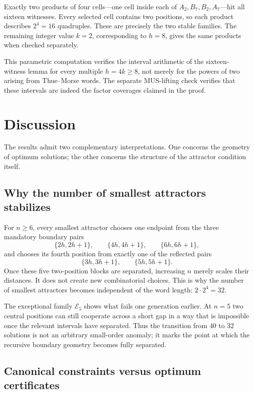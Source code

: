 \documentclass[10pt,a4paper]{article}
\theoremstyle{definition}\newtheorem{definition}[theorem]{Definition}
\theoremstyle{remark}\newtheorem{remark}[theorem]{Remark}
\begin{document}
Exactly two products of four cells---one cell inside each of $A_2,B_7,B_2,A_7$---hit all sixteen witnesses.  Every selected cell contains two positions, so each product describes $2^4=16$ quadruples.  These are precisely the two stable families.  The remaining integer value $k=2$, corresponding to $h=8$, gives the same products when checked separately.

This parametric computation verifies the interval arithmetic of the sixteen-witness lemma for every multiple $h=4k\ge8$, not merely for the powers of two arising from Thue--Morse words.  The separate MUS-lifting check verifies that these intervals are indeed the factor coverages claimed in the proof.


\section{Discussion}
\label{sec:discussion-extended}

The results admit two complementary interpretations.  One concerns the geometry of optimum solutions; the other concerns the structure of the attractor condition itself.

\subsection{Why the number of smallest attractors stabilizes}
\label{subsec:why-32}

For $n\ge6$, every smallest attractor chooses one endpoint from the three mandatory boundary pairs
\[
 \{2h,2h+1\},\qquad
 \{4h,4h+1\},\qquad
 \{6h,6h+1\},
\]
and chooses its fourth position from exactly one of the reflected pairs
\[
 \{3h,3h+1\},
 \qquad
 \{5h,5h+1\}.
\]
Once these five two-position blocks are separated, increasing $n$ merely scales their distances.  It does not create new combinatorial choices.  This is why the number of smallest attractors becomes independent of the word length:
$
 2\cdot2^4=32.
$

The exceptional family $\mathcal E_5$ shows what fails one generation earlier.  At $n=5$ two central positions can still cooperate across a short gap in a way that is impossible once the relevant intervals have separated.  Thus the transition from $40$ to $32$ solutions is not an arbitrary small-order anomaly; it marks the point at which the recursive boundary geometry becomes fully separated.

\subsection{Canonical constraints versus optimum certificates}
\label{subsec:two-levels}
\end{document}
